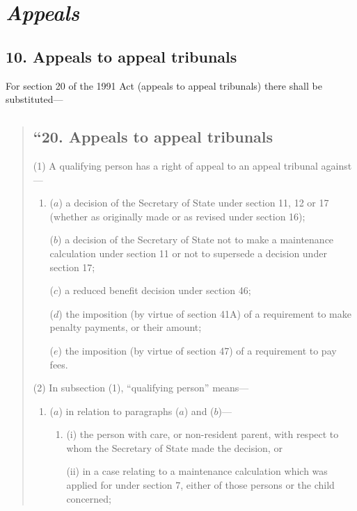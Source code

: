 \documentclass[12pt,a4paper]{article}
\begin{document}

\section{\itshape Appeals}

\subsection{10. Appeals to appeal tribunals}

For section 20 of the 1991 Act (appeals to appeal tribunals) there shall be substituted—
\begin{quotation}
\subsection*{“20. Appeals to appeal tribunals}

(1) A qualifying person has a right of appeal to an appeal tribunal against—
\begin{enumerate}\item[]
($a$) a decision of the Secretary of State under section 11, 12 or 17 (whether as originally made or as revised under section 16);

($b$) a decision of the Secretary of State not to make a maintenance calculation under section 11 or not to supersede a decision under section 17;

($c$) a reduced benefit decision under section 46;

($d$) the imposition (by virtue of section 41A) of a requirement to make penalty payments, or their amount;

($e$) the imposition (by virtue of section 47) of a requirement to pay fees.
\end{enumerate}

(2) In subsection (1), “qualifying person” means—
\begin{enumerate}\item[]
($a$) in relation to paragraphs ($a$)  and ($b$)—
\begin{enumerate}\item[]
(i) the person with care, or non-resident parent, with respect to whom the Secretary of State made the decision, or

(ii) in a case relating to a maintenance calculation which was applied for under section 7, either of those persons or the child concerned;
\end{enumerate}


\end{enumerate}
\end{quotation}
\end{document}
